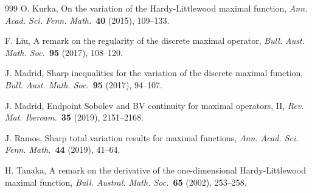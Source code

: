 \documentclass[leqno,11pt]{amsart}
\numberwithin{equation}{section}
\numberwithin{theorem}{section}
\begin{document}
\begin{thebibliography}{999}
	 O. Kurka,  
	On the variation of the Hardy-Littlewood maximal function,
	\emph{Ann. Acad. Sci. Fenn. Math.}~{\bf 40} (2015), 109--133.

	  F. Liu,  
	A remark on the regularity of the discrete maximal operator,
	\emph{Bull. Aust. Math. Soc.}~{\bf 95} (2017), 108--120.

	  J. Madrid,  
	Sharp inequalities for the variation of the discrete maximal function,
	\emph{Bull. Aust. Math. Soc.}~{\bf 95} (2017), 94--107.
	
	  J. Madrid,  
	Endpoint Sobolev and BV continuity for maximal operators, II,
	\emph{Rev. Mat. Iberoam.}~{\bf 35} (2019), 2151--2168.
	
	  J. Ramos,  
	Sharp total variation results for maximal functions,
	\emph{Ann. Acad. Sci. Fenn. Math.}~{\bf 44} (2019), 41--64.

	 H. Tanaka,  
	A remark on the derivative of the one-dimensional Hardy-Littlewood maximal function,
	\emph{Bull. Austral. Math. Soc.}~{\bf 65} (2002), 253--258.
	
\end{thebibliography} 
\end{document}
